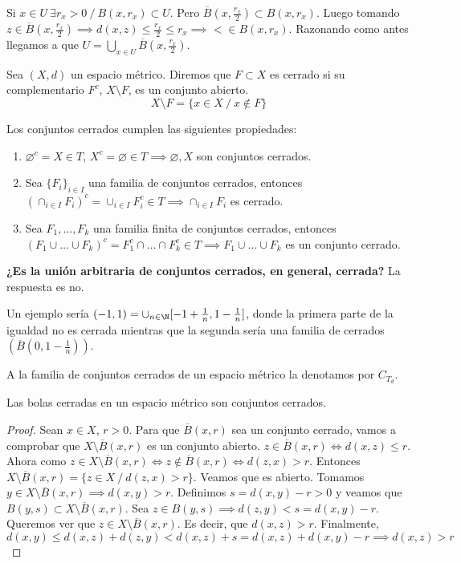 Si $x \in U \ \exists r_x>0\ /\ B(x,r_x) \subset U$. Pero $\overline{B}(x, \frac{r_x}{2}) \subset B(x,r_x)$. Luego tomando $z \in \overline{B}(x,\frac{r_x}{2}) \implies d(x,z) \le \frac{r_x}{2} \le r_x \implies < \in B(x,r_x)$. Razonando como antes llegamos a que $U = \bigcup_{x \in U} \overline{B}(x,\frac{r_x}{2})$.

\begin{ndef}[Cerrado]
  Sea $(X,d)$ un espacio métrico. Diremos que $F \subset X$ es cerrado si su complementario $F^c$, $X \setminus F$, es un conjunto abierto. \[ X\setminus F = \{x \in X\ /\ x \notin F\}\]
\end{ndef}
\begin{properties}
 Los conjuntos cerrados cumplen las siguientes propiedades:
    \begin{enumerate}
    \item $\varnothing ^c=X \in T$, $X^c=\varnothing \in T\implies \varnothing ,X$ son conjuntos cerrados.
    \item Sea $\{F_i\}_{i \in I}$ una familia de conjuntos cerrados, entonces $(\cap_{i \in I}F_i)^c = \cup_{i \in I}F_i^c \in T \implies \cap_{i \in I}F_i$ es cerrado.
    \item Sea $F_1,\ldots,F_k$ una familia finita de conjuntos cerrados, entonces $(F_1 \cup \ldots \cup F_k)^c=F_1^c \cap \ldots \cap F_k^c \in T \implies F_1 \cup \ldots \cup F_k$ es un conjunto cerrado.
    \end{enumerate}
\end{properties}
  \textbf{¿Es la unión arbitraria de conjuntos cerrados, en general, cerrada?} La respuesta es no.
  \begin{exmp}
    Un ejemplo sería $(-1,1)=\cup_{n \in \N}[-1+\frac{1}{n},1-\frac{1}{n}]$, donde la primera parte de la igualdad no es cerrada mientras que la segunda sería una familia de cerrados $(\overline{B}(0,1-\frac{1}{n}))$.
  \end{exmp}
  \begin{ndef}
      A la familia de conjuntos cerrados de un espacio métrico la denotamos por $C_{T_d}$.
  \end{ndef}

\begin{properties}
  Las bolas cerradas en un espacio métrico son conjuntos cerrados.
\end{properties}
\begin{proof}
  Sean $x \in X$, $r>0$. Para que $\overline{B}(x,r)$ sea un conjunto cerrado, vamos a comprobar que $X \setminus \overline{B}(x,r)$ es un conjunto abierto. $z \in \overline{B}(x,r) \Leftrightarrow d(x,z) \leq r$. Ahora como $z \in X \setminus \overline{B}(x,r) \Leftrightarrow z \notin  \overline{B}(x,r) \Leftrightarrow d(z,x)>r$. Entonces $X \setminus \overline{B}(x,r) = \{z \in X\ /\ d(z,x)>r\}$. Veamos que es abierto. Tomamos $y \in X \setminus \overline{B}(x,r) \implies d(x,y)>r$. Definimos $s=d(x,y)-r>0$ y veamos que $B(y,s) \subset X \setminus \overline{B}(x,r)$. Sea $z \in B(y,s) \implies d(z,y)<s=d(x,y)-r$. Queremos ver que $z \in X \setminus \overline{B}(x,r)$. Es decir, que $d(x,z)>r$. Finalmente, \[d(x,y) \le d(x,z) + d(z,y) < d(x,z) + s= d(x,z)+d(x,y)-r \implies d(x,z)>r\]
\end{proof}

